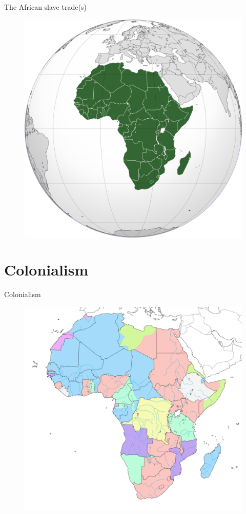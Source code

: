 \documentclass{beamer}
\begin{document}
\begin{frame}{The African slave trade(s)}

\begin{figure}
	\includegraphics[width=.7\linewidth]{img/africa.png}
\end{figure}

\end{frame}

\section{Colonialism}

\begin{frame}{Colonialism}
	\begin{figure}
		\includegraphics[width=.7\linewidth]{img/colonialAfrica.png}
	\end{figure}
\end{frame}
\end{document}
